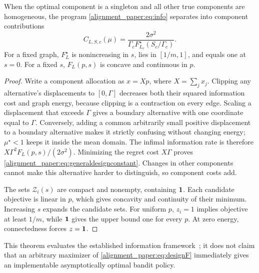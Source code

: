 \begin{theorem}
When the optimal component is a singleton and all other true components are homogeneous, the program \eqref{alignment_paper:eq:info} separates into component contributions
\begin{equation}
 C_{L,S,c}(\mu)=\frac{2\sigma^2}{\Gamma_c F_{L_c}^\star(S_c/\Gamma_c)}.
 \label{alignment_paper:eq:generaldesignconstant}
\end{equation}
For a fixed graph, $F_L^\star$ is nonincreasing in $s$, lies in $[1/m,1]$, and equals one at $s=0$. For a fixed $s$, $F_L(p,s)$ is concave and continuous in $p$.
\label{alignment_paper:thm:generaldesign}
\end{theorem}
\begin{proof}
Write a component allocation as $x=Xp$, where $X=\sum_jx_j$. Clipping any alternative's displacements to $[0,\Gamma]$ decreases both their squared information cost and graph energy, because clipping is a contraction on every edge. Scaling a displacement that exceeds $\Gamma$ gives a boundary alternative with one coordinate equal to $\Gamma$. Conversely, adding a common arbitrarily small positive displacement to a boundary alternative makes it strictly confusing without changing energy; $\mu^\star<1$ keeps it inside the mean domain. The infimal information rate is therefore $X\Gamma^2F_L(p,s)/(2\sigma^2)$. Minimizing the regret cost $X\Gamma$ proves \eqref{alignment_paper:eq:generaldesignconstant}. Changes in other components cannot make this alternative harder to distinguish, so component costs add.

The sets $\mathcal Z_i(s)$ are compact and nonempty, containing $\mathbf1$. Each candidate objective is linear in $p$, which gives concavity and continuity of their minimum. Increasing $s$ expands the candidate sets. For uniform $p$, $z_i=1$ implies objective at least $1/m$, while $\mathbf1$ gives the upper bound one for every $p$. At zero energy, connectedness forces $z=\mathbf1$.
\end{proof}
This theorem evaluates the established information framework~\cite{collected11}; it does not claim that an arbitrary maximizer of \eqref{alignment_paper:eq:designF} immediately gives an implementable asymptotically optimal bandit policy.

